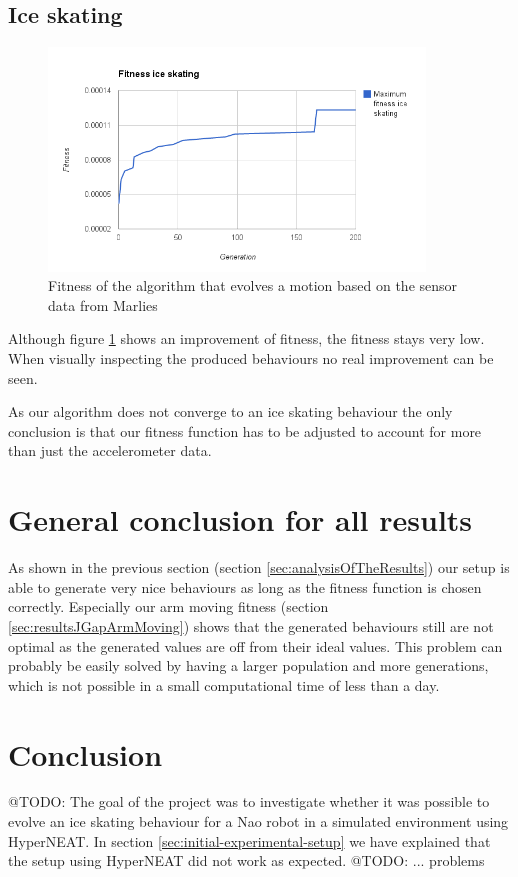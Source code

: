 \documentclass[a4paper,10pt]{article}
\begin{document}
\subsection{Ice skating}
\begin{figure}[h!]
\includegraphics[width=100mm]{images/iceskating}
\caption{Fitness of the algorithm that evolves a motion based on the sensor data from Marlies}
\label{fig:iceskatingFitness}
\end{figure}

Although figure \ref{fig:iceskatingFitness} shows an improvement of fitness, the fitness stays very low. When visually inspecting the produced behaviours no real improvement can be seen. 

As our algorithm does not converge to an ice skating behaviour the only conclusion is that our fitness function has to be adjusted to account for more than just the accelerometer data. 


\section{General conclusion for all results}
As shown in the previous section (section \ref{sec:analysisOfTheResults}) our setup is able to generate very nice behaviours as long as the fitness function is chosen correctly. Especially our arm moving fitness (section \ref{sec:resultsJGapArmMoving}) shows that the generated behaviours still are not optimal as the generated values are off from their ideal values. This problem can probably be easily solved by having a larger population and more generations, which is not possible in a small computational time of less than a day. 


\section{Conclusion}
\label{sec:conclusion}
@TODO: The goal of the project was to investigate whether it was possible to evolve an ice skating behaviour for a Nao robot in a simulated environment using HyperNEAT. In section \ref{sec:initial-experimental-setup} we have explained that the setup using HyperNEAT did not work as expected. @TODO: ... problems
\end{document}
